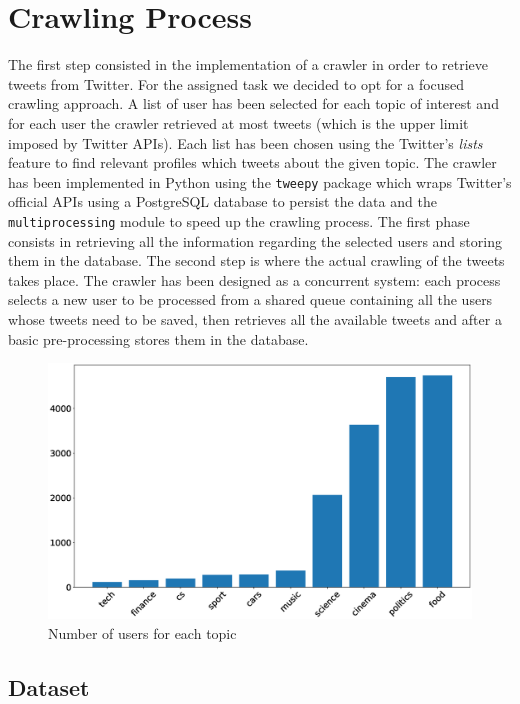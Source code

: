 \section{Crawling Process}

The first step consisted in the implementation of a crawler in order to retrieve tweets from Twitter. For the assigned task we decided to opt for a focused crawling approach. A list of user has been selected for each topic of interest and for each user the crawler retrieved at most  tweets (which is the upper limit imposed by Twitter APIs). Each list has been chosen using the Twitter's \textit{lists} feature to find relevant profiles which tweets about the given topic.
The crawler has been implemented in Python using the \verb|tweepy| package which wraps Twitter's official APIs using a PostgreSQL database to persist the data and the \verb|multiprocessing| module to speed up the crawling process. The first phase consists in retrieving all the information regarding the selected users and storing them in the database. The second step is where the actual crawling of the tweets takes place. 
The crawler has been designed as a concurrent system: each process selects a new user to be processed from a shared queue containing all the users whose tweets need to be saved, then retrieves all the available tweets and after a basic pre-processing stores them in the database.

\begin{figure}[!h]
    \centering
    \includegraphics[width=1\textwidth]{topics.eps}
    \caption{Number of users for each topic}
    \label{fig:users-distribution}
\end{figure}


\subsection{Dataset}

